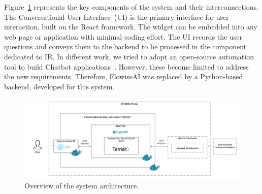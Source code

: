 Figure~\ref{fig_arch} represents the key components of the system and their interconnections. The Conversational User Interface~(UI) is the primary interface for user interaction, built on the React framework. The widget can be embedded into any web page or application with minimal coding effort. The UI records the user questions and conveys them to the backend to be processed in the component dedicated to IR. In different work, we tried to adopt an open-source automation tool to build Chatbot applications~\cite{reis2024flowise}. However, these become limited to address the new requirements. Therefore, FlowiseAI was replaced by a Python-based backend, developed for this system.

\begin{figure}[ht]
    \includegraphics[width=\textwidth]{figs/chapter3/architecture.png}
    \centering
    \caption{Overview of the system architecture.}
    \label{fig_arch}
\end{figure}
